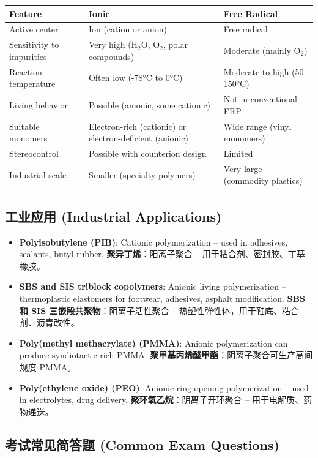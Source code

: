 \documentclass[12pt,a4paper]{ctexart}
\begin{document}
\begin{longtable}{p{5cm}p{5cm}p{5cm}}
\toprule
\textbf{Feature} & \textbf{Ionic} & \textbf{Free Radical} \\
\midrule
Active center & Ion (cation or anion) & Free radical \\
Sensitivity to impurities & Very high (H$_2$O, O$_2$, polar compounds) & Moderate (mainly O$_2$) \\
Reaction temperature & Often low (-78°C to 0°C) & Moderate to high (50–150°C) \\
Living behavior & Possible (anionic, some cationic) & Not in conventional FRP \\
Suitable monomers & Electron-rich (cationic) or electron-deficient (anionic) & Wide range (vinyl monomers) \\
Stereocontrol & Possible with counterion design & Limited \\
Industrial scale & Smaller (specialty polymers) & Very large (commodity plastics) \\
\bottomrule
\end{longtable}

\subsection{工业应用 (Industrial Applications)}

\begin{itemize}
    \item \textbf{Polyisobutylene (PIB)}: Cationic polymerization – used in adhesives, sealants, butyl rubber.  
      \textbf{聚异丁烯}：阳离子聚合 – 用于粘合剂、密封胶、丁基橡胶。
    \item \textbf{SBS and SIS triblock copolymers}: Anionic living polymerization – thermoplastic elastomers for footwear, adhesives, asphalt modification.  
      \textbf{SBS 和 SIS 三嵌段共聚物}：阴离子活性聚合 – 热塑性弹性体，用于鞋底、粘合剂、沥青改性。
    \item \textbf{Poly(methyl methacrylate) (PMMA)}: Anionic polymerization can produce syndiotactic-rich PMMA.  
      \textbf{聚甲基丙烯酸甲酯}：阴离子聚合可生产高间规度 PMMA。
    \item \textbf{Poly(ethylene oxide) (PEO)}: Anionic ring-opening polymerization – used in electrolytes, drug delivery.  
      \textbf{聚环氧乙烷}：阴离子开环聚合 – 用于电解质、药物递送。
\end{itemize}

\subsection{考试常见简答题 (Common Exam Questions)}
\end{document}
